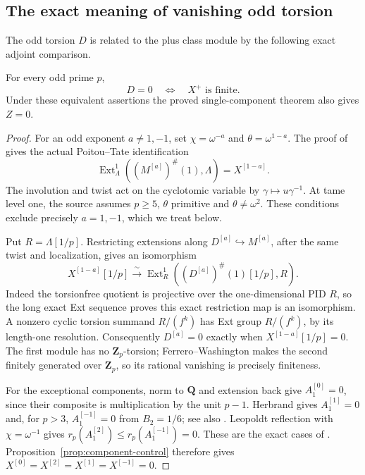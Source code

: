 \subsection{The exact meaning of vanishing odd torsion}
\label{subsec:odd-torsion-plus-adjoint}

The odd torsion $D$ is related to the plus class module
by the following exact adjoint comparison.

\begin{proposition}\label{prop:D-plus-finiteness}
For every odd prime $p$,
\[
                             D=0\quad\Longleftrightarrow\quad X^+\text{ is finite}.
\]
Under these equivalent assertions the proved
single-component theorem also gives $Z=0$.
\end{proposition}

\begin{proof}
For an odd exponent $a\ne1,-1$, set
$\chi=\omega^{-a}$ and $\theta=\omega^{1-a}$.
The proof of \cite[Proposition~2.2.6, p.~4]{WWEOrd}
gives the actual Poitou--Tate identification
\[
 \operatorname{Ext}^1_\Lambda
       ((M^{[a]})^\#(1),\Lambda)=X^{[1-a]}.
\]
The involution and twist act on the cyclotomic
variable by $\gamma\mapsto u\gamma^{-1}$.
At tame level one, the source assumes $p\geq5$,
$\theta$ primitive and $\theta\ne\omega^2$. These
conditions exclude precisely $a=1,-1$, which we treat below.

Put $R=\Lambda[1/p]$. Restricting extensions along
$D^{[a]}\hookrightarrow M^{[a]}$, after the same
twist and localization, gives an isomorphism
\[
 X^{[1-a]}[1/p]\xrightarrow{\ \sim\ }
 \operatorname{Ext}^1_R
       ((D^{[a]})^\#(1)[1/p],R).
\]
Indeed the torsionfree quotient is projective over
the one-dimensional PID $R$, so the long exact
Ext sequence proves this exact restriction map is
an isomorphism. A nonzero cyclic torsion summand
$R/(f^k)$ has Ext group $R/(f^k)$, by its length-one
resolution. Consequently $D^{[a]}=0$ exactly when
$X^{[1-a]}[1/p]=0$. The first module has no
$\mathbf Z_p$-torsion; Ferrero--Washington makes
the second finitely generated over $\mathbf Z_p$,
so its rational vanishing is precisely finiteness.

For the exceptional components, norm to $\mathbf Q$
and extension back give $A_1^{[0]}=0$, since their
composite is multiplication by the unit $p-1$.
Herbrand gives $A_1^{[1]}=0$ and, for $p>3$,
$A_1^{[-1]}=0$ from $B_2=1/6$; see also
\cite[Lemma~5.2.7, p.~13]{WWEOrd}.
Leopoldt reflection with $\chi=\omega^{-1}$ gives
$r_p(A_1^{[2]})\leq r_p(A_1^{[-1]})=0$.
These are the exact cases of
\cite[Theorems~4.4.2 and~4.5.7]{SharifiIwa}.
Proposition~\ref{prop:component-control} therefore
gives $X^{[0]}=X^{[2]}=X^{[1]}=X^{[-1]}=0$.


\end{proof}
